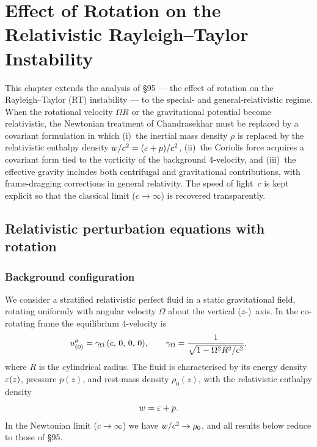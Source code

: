 %

\chapter{Effect of Rotation on the Relativistic Rayleigh--Taylor
  Instability}\label{ch:rel-10-95}

This chapter extends the analysis of \S95 --- the effect of rotation
on the Rayleigh--Taylor (RT) instability --- to the special- and
general-relativistic regime.  When the rotational velocity $\Omega R$
or the gravitational potential become relativistic, the Newtonian
treatment of Chandrasekhar must be replaced by a covariant formulation
in which (i)~the inertial mass density $\rho$ is replaced by the
relativistic enthalpy density $w/c^{2} = (\varepsilon + p)/c^{2}$,
(ii)~the Coriolis force acquires a covariant form tied to the vorticity
of the background 4-velocity, and (iii)~the effective gravity includes
both centrifugal and gravitational contributions, with frame-dragging
corrections in general relativity.  The speed of light~$c$ is kept
explicit so that the classical limit ($c\to\infty$) is recovered
transparently.

\section{Relativistic perturbation equations with rotation}
\label{sec:rel-95-eqs}

\subsection{Background configuration}

We consider a stratified relativistic perfect fluid in a static
gravitational field, rotating uniformly with angular velocity
$\Omega$ about the vertical ($z$-)~axis.  In the co-rotating frame
the equilibrium 4-velocity is
\begin{equation}
  u^{\mu}_{(0)} = \gamma_{\Omega}\,(c,\,0,\,0,\,0),
  \qquad
  \gamma_{\Omega} = \frac{1}{\sqrt{1 - \Omega^{2}R^{2}/c^{2}}},
  \label{eq:rel95-bg4vel}
\end{equation}
where $R$ is the cylindrical radius.  The fluid is characterised by its
energy density $\varepsilon(z)$, pressure $p(z)$, and rest-mass density
$\rho_{0}(z)$, with the relativistic enthalpy density
\begin{equation}
  w = \varepsilon + p.
  \label{eq:rel95-enthalpy}
\end{equation}
In the Newtonian limit ($c\to\infty$) we have
$w/c^{2}\to\rho_{0}$, and all results below reduce to those
of \S95.

